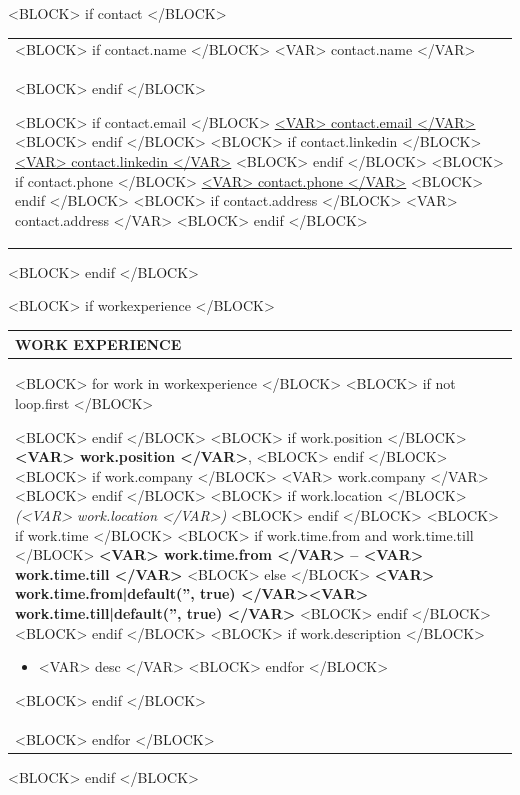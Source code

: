\documentclass[<VAR> meta.fontsize|default('10pt', true) </VAR>]{extarticle}                %
\begin{document}
<BLOCK> if contact </BLOCK>
\begin{tabularx}{\textwidth}{>{\centering\arraybackslash}X}

    <BLOCK> if contact.name </BLOCK>
    \fontsize{<VAR> meta.titlesize|default('42pt', true) </VAR>}{0}
    \selectfont <VAR> contact.name </VAR> \\
    <BLOCK> endif </BLOCK>

    <BLOCK> if contact.email </BLOCK>
    \href{mailto:<VAR> contact.email </VAR>}{<VAR> contact.email </VAR>} \hfill
    <BLOCK> endif </BLOCK>
    <BLOCK> if contact.linkedin </BLOCK>
    \href{https://www.<VAR> contact.linkedin </VAR>}{<VAR> contact.linkedin </VAR>} \hfill
    <BLOCK> endif </BLOCK>
    <BLOCK> if contact.phone </BLOCK>
    \href{tel:<VAR> contact.phone </VAR>}{<VAR> contact.phone </VAR>} \hfill
    <BLOCK> endif </BLOCK>
    <BLOCK> if contact.address </BLOCK>
    <VAR> contact.address </VAR> \hfill
    <BLOCK> endif </BLOCK>

\end{tabularx}
<BLOCK> endif </BLOCK>

<BLOCK> if workexperience </BLOCK>
\begin{tabularx}{\textwidth}{>{\raggedright\arraybackslash}X}

    \large\textbf{WORK EXPERIENCE} \\
    \toprule[1pt]

    <BLOCK> for work in workexperience </BLOCK>
        <BLOCK> if not loop.first </BLOCK>

        \toprule[0.5pt]
        <BLOCK> endif </BLOCK>
        <BLOCK> if work.position </BLOCK>
        \textbf{<VAR> work.position </VAR>}, 
        <BLOCK> endif </BLOCK>
        <BLOCK> if work.company </BLOCK>
        <VAR> work.company </VAR> 
        <BLOCK> endif </BLOCK>
        <BLOCK> if work.location </BLOCK>
        \textit{(<VAR> work.location </VAR>)} 
        <BLOCK> endif </BLOCK>
        <BLOCK> if work.time </BLOCK>
        <BLOCK> if work.time.from and work.time.till </BLOCK>
        \hfill \textbf{<VAR> work.time.from </VAR> – <VAR> work.time.till </VAR>}
        <BLOCK> else </BLOCK>
        \hfill \textbf{<VAR> work.time.from|default('', true) </VAR><VAR> work.time.till|default('', true) </VAR>}
        <BLOCK> endif </BLOCK>
        <BLOCK> endif </BLOCK>
        <BLOCK> if work.description </BLOCK>
        \begin{itemize}
        <BLOCK> for desc in work.description </BLOCK>
            \item <VAR> desc </VAR>
        <BLOCK> endfor </BLOCK>
        \end{itemize}
        <BLOCK> endif </BLOCK>
        \\
    <BLOCK> endfor </BLOCK>

\end{tabularx}
<BLOCK> endif </BLOCK>
\end{document}
